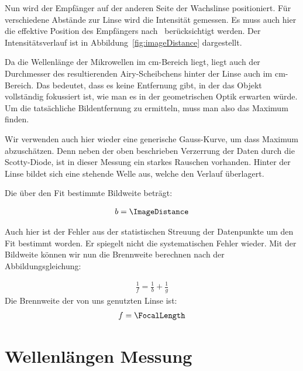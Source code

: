 \documentclass[a4paper,10pt,twocolumn]{article}
\begin{document}
    Nun wird der Empfänger auf der anderen Seite der Wachslinse positioniert.
    Für verschiedene Abstände zur Linse wird die Intensität gemessen.
    Es muss auch hier die effektive Position des Empfängers nach~\cite{pasco} berücksichtigt werden.
    Der Intensitätsverlauf ist in Abbildung~\ref{fig:imageDistance} dargestellt.
    
    Da die Wellenlänge der Mikrowellen im cm-Bereich liegt, liegt auch der Durchmesser 
    des resultierenden Airy-Scheibchens hinter der Linse auch im cm-Bereich.
    Das bedeutet, dass es keine Entfernung gibt, in der das Objekt vollständig fokussiert ist, wie man es in der
    geometrischen Optik erwarten würde. 
    Um die tatsächliche Bildentfernung zu ermitteln, muss man also das Maximum finden.
    
    Wir verwenden auch hier wieder eine generische Gauss-Kurve, um dass Maximum abzuschätzen.
    Denn neben der oben beschrieben Verzerrung der Daten durch die Scotty-Diode, ist in dieser Messung ein
    starkes Rauschen vorhanden.
    Hinter der Linse bildet sich eine stehende Welle aus, welche den Verlauf überlagert.
    
    
    Die über den Fit bestimmte Bildweite beträgt:
    
    \begin{align*}
        b = \ImageDistance
    \end{align*}

    Auch hier ist der Fehler aus der statistischen Streuung der Datenpunkte um den Fit bestimmt worden.
    Er spiegelt nicht die systematischen Fehler wieder.
    Mit der Bildweite können wir nun die Brennweite berechnen nach der Abbildungsgleichung:
    
    \begin{align}
        \label{eq:LensFormula}
        \frac{1}{f} = \frac{1}{b} + \frac{1}{g}
    \end{align}
    Die Brennweite der von uns genutzten Linse ist:
    \begin{align*}
        f = \FocalLength
    \end{align*}
    
    \section{Wellenlängen Messung}
\end{document}
